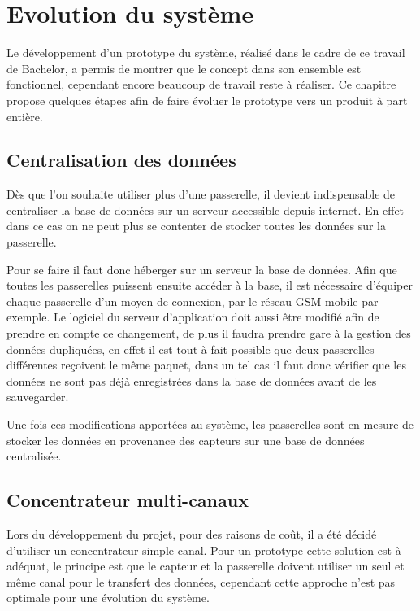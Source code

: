 
\chapter{Evolution du système}\label{ch:produit}

Le développement d'un prototype du système, réalisé dans le cadre de ce travail de Bachelor, a permis de montrer que le concept dans son ensemble est fonctionnel, cependant encore beaucoup de travail reste à réaliser. Ce chapitre propose quelques étapes afin de faire évoluer le prototype vers un produit à part entière.

\section{Centralisation des données}

Dès que l'on souhaite utiliser plus d'une passerelle, il devient indispensable de centraliser la base de données sur un serveur accessible depuis internet. En effet dans ce cas on ne peut plus se contenter de stocker toutes les données sur la passerelle.

Pour se faire il faut donc héberger sur un serveur la base de données. Afin que toutes les passerelles puissent ensuite accéder à la base, il est nécessaire d'équiper chaque passerelle d'un moyen de connexion, par le réseau GSM mobile par exemple. Le logiciel du serveur d'application doit aussi être modifié afin de prendre en compte ce changement, de plus il faudra prendre gare à la gestion des données dupliquées, en effet il est tout à fait possible que deux passerelles différentes reçoivent le même paquet, dans un tel cas il faut donc vérifier que les données ne sont pas déjà enregistrées dans la base de données avant de les sauvegarder.

Une fois ces modifications apportées au système, les passerelles sont en mesure de stocker les données en provenance des capteurs sur une base de données centralisée.

\section{Concentrateur multi-canaux}


Lors du développement du projet, pour des raisons de coût, il a été décidé d'utiliser un concentrateur simple-canal. Pour un prototype cette solution est à adéquat, le principe est que le capteur et la passerelle doivent utiliser un seul et même canal pour le transfert des données, cependant cette approche n'est pas optimale pour une évolution du système.

